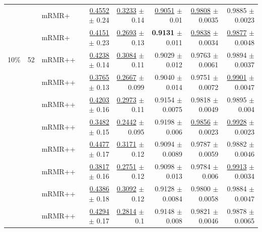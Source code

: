 \begin{longtable}{llp{}rrrrr}
 &  & mRMR+ & \underline{0.4552} {\scriptsize $\pm$ 0.24} & \underline{0.3233} {\scriptsize $\pm$ 0.14} & \underline{0.9051} {\scriptsize $\pm$ 0.01} & \underline{0.9808} {\scriptsize $\pm$ 0.0035} & 0.9885 {\scriptsize $\pm$ 0.0023} \\
 &  & mRMR+ & \underline{0.4151} {\scriptsize $\pm$ 0.23} & \underline{0.2693} {\scriptsize $\pm$ 0.13} & \textbf{0.9131} {\scriptsize $\pm$ 0.011} & \underline{0.9838} {\scriptsize $\pm$ 0.0034} & \underline{0.9877} {\scriptsize $\pm$ 0.0048} \\
\midrule
10\% & 52 & mRMR++ & \underline{0.4238} {\scriptsize $\pm$ 0.14} & \underline{0.3084} {\scriptsize $\pm$ 0.11} & 0.9029 {\scriptsize $\pm$ 0.012} & 0.9763 {\scriptsize $\pm$ 0.0061} & 0.9894 {\scriptsize $\pm$ 0.0037} \\
 &  & mRMR++ & \underline{0.3765} {\scriptsize $\pm$ 0.13} & \underline{0.2667} {\scriptsize $\pm$ 0.099} & 0.9040 {\scriptsize $\pm$ 0.014} & 0.9751 {\scriptsize $\pm$ 0.0072} & \underline{0.9901} {\scriptsize $\pm$ 0.0047} \\
 &  & mRMR++ & \underline{0.4203} {\scriptsize $\pm$ 0.16} & \underline{0.2973} {\scriptsize $\pm$ 0.11} & 0.9154 {\scriptsize $\pm$ 0.0075} & 0.9818 {\scriptsize $\pm$ 0.0049} & 0.9895 {\scriptsize $\pm$ 0.004} \\
 &  & mRMR++ & \underline{0.3482} {\scriptsize $\pm$ 0.15} & \underline{0.2442} {\scriptsize $\pm$ 0.095} & 0.9198 {\scriptsize $\pm$ 0.006} & \underline{0.9856} {\scriptsize $\pm$ 0.0023} & \underline{0.9928} {\scriptsize $\pm$ 0.0023} \\
 &  & mRMR++ & \underline{0.4477} {\scriptsize $\pm$ 0.17} & \underline{0.3171} {\scriptsize $\pm$ 0.12} & 0.9094 {\scriptsize $\pm$ 0.0089} & 0.9787 {\scriptsize $\pm$ 0.0059} & 0.9882 {\scriptsize $\pm$ 0.0046} \\
 &  & mRMR++ & \underline{0.3817} {\scriptsize $\pm$ 0.16} & \underline{0.2751} {\scriptsize $\pm$ 0.12} & 0.9098 {\scriptsize $\pm$ 0.013} & 0.9784 {\scriptsize $\pm$ 0.006} & \underline{0.9913} {\scriptsize $\pm$ 0.0034} \\
 &  & mRMR++ & \underline{0.4386} {\scriptsize $\pm$ 0.18} & \underline{0.3092} {\scriptsize $\pm$ 0.12} & 0.9128 {\scriptsize $\pm$ 0.0084} & 0.9800 {\scriptsize $\pm$ 0.0058} & 0.9884 {\scriptsize $\pm$ 0.0047} \\
 &  & mRMR++ & \underline{0.4294} {\scriptsize $\pm$ 0.17} & \underline{0.2814} {\scriptsize $\pm$ 0.1} & 0.9148 {\scriptsize $\pm$ 0.008} & 0.9821 {\scriptsize $\pm$ 0.0046} & 0.9878 {\scriptsize $\pm$ 0.0065} \\

\end{longtable}
